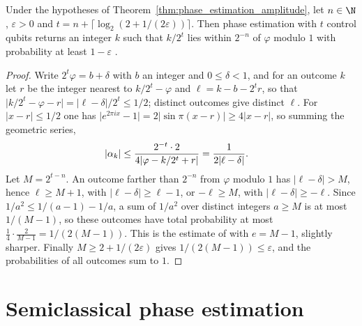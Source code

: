 \begin{theorem}
    \label{thm:phase_estimation_success}
    \leanok
    Under the hypotheses of Theorem~\ref{thm:phase_estimation_amplitude}, let $n\in\N$,
    $\varepsilon>0$ and $t=n+\lceil\log_2(2+1/(2\varepsilon))\rceil$. Then phase
    estimation with $t$ control qubits returns an integer $k$ such that $k/2^t$ lies
    within $2^{-n}$ of $\varphi$ modulo $1$ with probability at least $1-\varepsilon$
    \cite[eq.~(5.35)]{NielsenChuang2010}.
\end{theorem}
\begin{proof}\leanok
    Write $2^t\varphi=b+\delta$ with $b$ an integer and $0\le\delta<1$, and for an
    outcome $k$ let $r$ be the integer nearest to $k/2^t-\varphi$ and
    $\ell=k-b-2^tr$, so that $\lvert k/2^t-\varphi-r\rvert=\lvert\ell-\delta\rvert/2^t\le1/2$;
    distinct outcomes give distinct $\ell$. For $\lvert x-r\rvert\le1/2$ one has
    $\lvert e^{2\pi ix}-1\rvert=2\lvert\sin\pi(x-r)\rvert\ge4\lvert x-r\rvert$, so summing
    the geometric series,
    \begin{align}
        \lvert\alpha_k\rvert&\le\frac{2^{-t}\cdot2}{4\lvert\varphi-k/2^t+r\rvert}
        =\frac1{2\lvert\ell-\delta\rvert}.
        \notag
    \end{align}
    Let $M=2^{t-n}$. An outcome farther than $2^{-n}$ from $\varphi$ modulo $1$ has
    $\lvert\ell-\delta\rvert>M$, hence $\ell\ge M+1$, with $\lvert\ell-\delta\rvert\ge\ell-1$,
    or $-\ell\ge M$, with $\lvert\ell-\delta\rvert\ge-\ell$. Since
    $1/a^2\le1/(a-1)-1/a$, a sum of $1/a^2$ over distinct integers $a\ge M$ is at most
    $1/(M-1)$, so these outcomes have total probability at most
    $\frac14\cdot\frac2{M-1}=1/(2(M-1))$. This is the estimate of
    \cite[eqs.~(5.30)--(5.34)]{NielsenChuang2010} with $e=M-1$, slightly sharper. Finally
    $M\ge2+1/(2\varepsilon)$ gives $1/(2(M-1))\le\varepsilon$, and the probabilities of
    all outcomes sum to $1$.
\end{proof}

\section{Semiclassical phase estimation}
\label{sec:phase_estimation_semiclassical}


